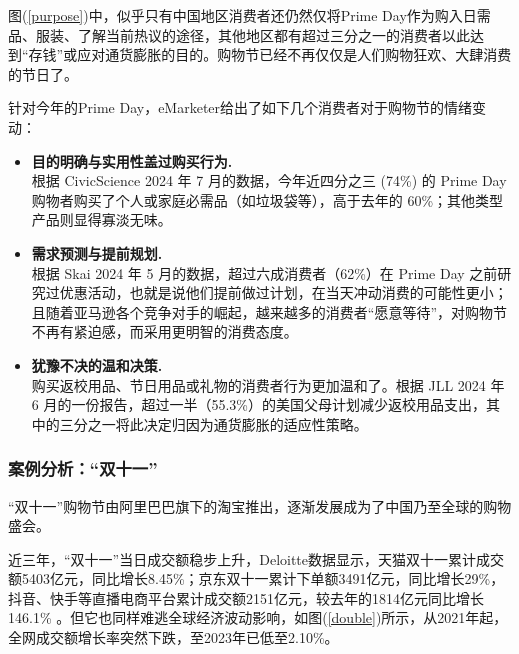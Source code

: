 \documentclass[12pt]{ctexart}
\begin{document}
图(\ref{purpose})中，似乎只有中国地区消费者还仍然仅将Prime Day作为购入日需品、服装、了解当前热议的途径，其他地区都有超过三分之一的消费者以此达到“存钱”或应对通货膨胀的目的。购物节已经不再仅仅是人们购物狂欢、大肆消费的节日了。

针对今年的Prime Day，eMarketer给出了如下几个消费者对于购物节的情绪变动\cite{15}：
\begin{itemize}
    \item \textbf{目的明确与实用性盖过购买行为.} \\
    根据 CivicScience 2024 年 7 月的数据，今年近四分之三 (74\%) 的 Prime Day 购物者购买了个人或家庭必需品（如垃圾袋等），高于去年的 60\%；其他类型产品则显得寡淡无味。
    \item \textbf{需求预测与提前规划.} \\
    根据 Skai 2024 年 5 月的数据，超过六成消费者（62\%）在 Prime Day 之前研究过优惠活动，也就是说他们提前做过计划，在当天冲动消费的可能性更小；且随着亚马逊各个竞争对手的崛起，越来越多的消费者“愿意等待”，对购物节不再有紧迫感，而采用更明智的消费态度。
    \item \textbf{犹豫不决的温和决策.} \\
    购买返校用品、节日用品或礼物的消费者行为更加温和了。根据 JLL 2024 年 6 月的一份报告，超过一半（55.3\%）的美国父母计划减少返校用品支出，其中的三分之一将此决定归因为通货膨胀的适应性策略。
\end{itemize}


\subsubsection{案例分析：“双十一”}
“双十一”购物节由阿里巴巴旗下的淘宝推出，逐渐发展成为了中国乃至全球的购物盛会。

近三年，“双十一”当日成交额稳步上升，Deloitte数据显示，天猫双十一累计成交额5403亿元，同比增长8.45\%；京东双十一累计下单额3491亿元，同比增长29\%，抖音、快手等直播电商平台累计成交额2151亿元，较去年的1814亿元同比增长146.1\% \cite{16}。但它也同样难逃全球经济波动影响，如图(\ref{double})所示，从2021年起，全网成交额增长率突然下跌，至2023年已低至2.10\%。
\end{document}
